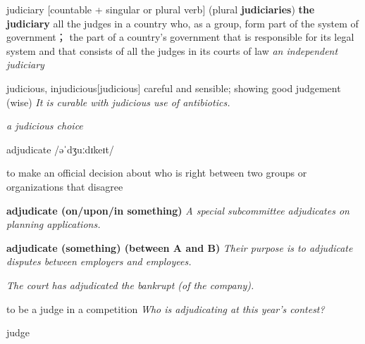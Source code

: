 \begin{DefWord}{judiciary}
    [countable + singular or plural verb]
    (plural \textbf{judiciaries})
    \textbf{the judiciary}
    all the judges in a country who, as a group, form part of the system of government； the part of a country’s government that is responsible for its legal system and that consists of all the judges in its courts of law
    \textit{an independent judiciary}
\end{DefWord}

\begin{DefWord}{judicious, injudicious}[judicious]
    careful and sensible; showing good judgement (wise)
    \textit{It is curable with judicious use of antibiotics.}

    \textit{a judicious choice}
\end{DefWord}

\begin{DefWord}{adjudicate}
    /əˈdʒuːdɪkeɪt/

    to make an official decision about who is right between two groups or organizations that disagree

    \textbf{adjudicate (on/upon/in something)} \textit{A special subcommittee adjudicates on planning applications.}

    \textbf{adjudicate (something) (between A and B)} \textit{Their purpose is to adjudicate disputes between employers and employees.}

    \textit{The court has adjudicated the bankrupt (of the company).}

    to be a judge in a competition
    \textit{Who is adjudicating at this year's contest?}


\end{DefWord}

\begin{DefWord}{judge}
\end{DefWord}

